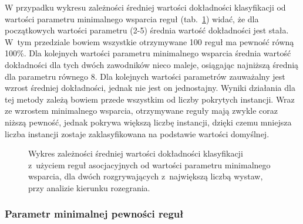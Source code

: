 \documentclass[a4paper,twoside,12pt]{book}
\begin{document}
W przypadku wykresu zależności średniej wartości dokładności klasyfikacji od wartości parametru minimalnego wsparcia reguł (tab.~\ref{fig:support-r-kierunek-rules}) widać, że dla początkowych wartości parametru (2-5) średnia wartość dokładności jest stała. W~tym przedziale bowiem wszystkie otrzymywane 100 reguł ma pewność równą 100\%. Dla kolejnych wartości parametru minimalnego wsparcia średnia wartość dokładności dla tych dwóch zawodników nieco maleje, osiągając najniższą średnią dla parametru równego 8. Dla kolejnych wartości parametrów zauważalny jest wzrost średniej dokładności, jednak nie jest on jednostajny. Wyniki działania dla tej metody zależą bowiem przede wszystkim od liczby pokrytych instancji. Wraz ze wzrostem minimalnego wsparcia, otrzymywane reguły mają zwykle coraz niższą pewność, jednak pokrywa większą liczbę instancji, dzięki czemu mniejsza liczba instancji zostaje zaklasyfikowana na podstawie wartości domyślnej.

\begin{figure}
\centering
{}
\caption{Wykres zależności średniej wartości dokładności klasyfikacji z~użyciem reguł asocjacyjnych od wartości parametru minimalnego wsparcia, dla dwóch rozgrywających z~największą liczbą wystaw, przy analizie kierunku rozegrania.}
\label{fig:support-r-kierunek-rules}
\end{figure}

\subsubsection{Parametr minimalnej pewności reguł}
\end{document}
